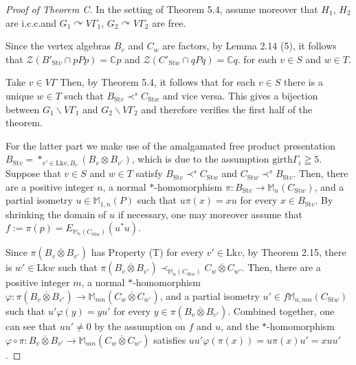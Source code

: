 \documentclass{amsart}
\theoremstyle{definition}
\newcommand{\action}{\curvearrowright}
\newcommand{\Mat}{\mathbb{M}}
\newcommand{\C}{\mathbb{C}}
\begin{document}
\begin{proof}[Proof of Theorem C]
In the setting of Theorem 5.4, assume moreover that $H_1$, $H_2$ are i.c.c.\@ and 
$G_1\action V\Gamma_1$, $G_2\action V\Gamma_2$ are free. 

Since the vertex algebras $B_v$ and $C_w$ are factors,
by Lemma 2.14 (5), it follows that $\mathcal{Z}(B'_{\mathrm{St}v}\cap pPp)=\C p$ and
$\mathcal{Z}(C'_{\mathrm{St}w}\cap qPq)=\C q$. for each $v\in S$ and $w\in T$. 

Take $v\in V\Gamma$ 
Then, by Theorem 5.4, it follows that for each $v\in S$ there is a unique $w\in T$
such that $B_{\mathrm{St}v}\prec^s C_{\mathrm{St}w}$ and vice versa. This gives a 
bijection between $G_1\backslash V\Gamma_1$ and $G_2\backslash V\Gamma_2$ and 
therefore verifies the first half of the theorem. 


For the latter part we make use of the amalgamated free product presentation $B_{\mathrm{St}v}=\ast_{v'\in \mathrm{Lk}v, B_v} (B_v\otimes B_{v'})$,
which is due to the assumption $\mathrm{girth}\Gamma_i\geqq 5$. 
Suppose that $v\in S$ and $w\in T$ satisfy
$B_{\mathrm{St}v}\prec^s C_{\mathrm{St}w}$ and 
$C_{\mathrm{St}w}\prec^s B_{\mathrm{St}v}$. 
Then, there are 
a positive integer $n$, a normal $\ast$-homomorphism $\pi : B_{\mathrm{St}v}\to \Mat_n(C_{\mathrm{St}w})$, and a partial isometry $u\in \Mat_{1,n}(P)$ such that 
$u\pi(x)=xu$ for every $x\in B_{\mathrm{St}v}$. 
By shrinking the domain of $u$ if necessary, one may
moreover assume that $f:=\pi(p)=E_{\Mat_n(C_{\mathrm{St}w})}(u^{\ast}u)$. 

Since $\pi(B_v\overline{\otimes} B_{v'})$ has Property (T)
for every $v'\in \mathrm{Lk}v$, 
by Theorem 2.15, there is $w'\in \mathrm{Lk}w$
such that 
$\pi(B_v\overline{\otimes} B_{v'})\prec_{\Mat_n(C_{\mathrm{St}w})} C_w\overline{\otimes} C_{w'}$. 
Then, there are 
a positive integer $m$, a normal $\ast$-homomorphism 
$\varphi : \pi(B_v\overline{\otimes} B_{v'})
\to \Mat_{mn}(C_w\overline{\otimes} C_{w'})$, and a partial isometry 
$u'\in f\Mat_{n,mn}(C_{\mathrm{St}w})$ such that 
$u'\varphi(y)=yu'$ for every $y\in \pi(B_v\overline{\otimes} B_{v'})$. 
Combined together, one can see that $uu'\neq 0$ by the assumption on $f$ and $u$, 
and the $\ast$-homomorphism $\varphi\circ \pi : B_v\overline{\otimes} B_{v'} \to \Mat_{mn}(C_w\overline{\otimes} C_{w'})$ satisfies
$uu'\varphi(\pi(x))= u\pi(x)u'=xuu'$. 


\end{proof}
\end{document}
